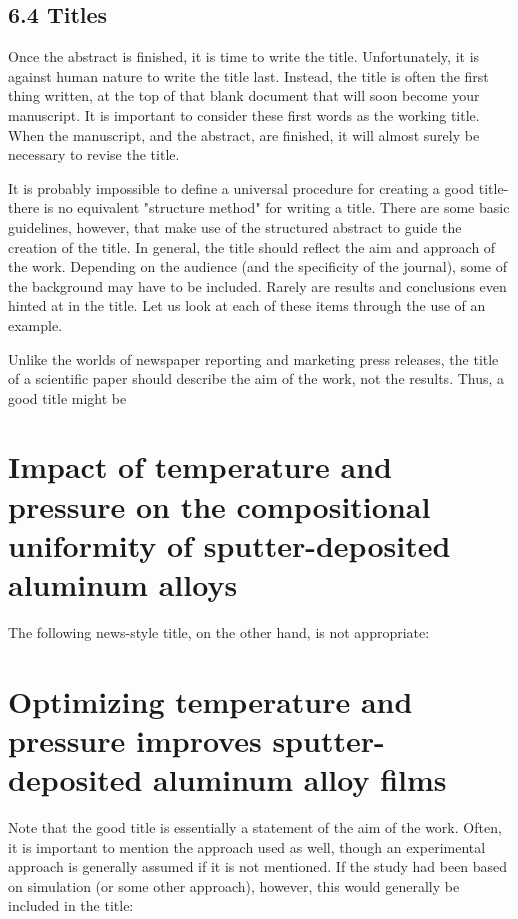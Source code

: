 \subsection*{6.4 Titles}
Once the abstract is finished, it is time to write the title. Unfortunately, it is against human nature to write the title last. Instead, the title is often the first thing written, at the top of that blank document that will soon become your manuscript. It is important to consider these first words as the working title. When the manuscript, and the abstract, are finished, it will almost surely be necessary to revise the title.

It is probably impossible to define a universal procedure for creating a good title- there is no equivalent "structure method" for writing a title. There are some basic guidelines, however, that make use of the structured abstract to guide the creation of the title. In general, the title should reflect the aim and approach of the work. Depending on the audience (and the specificity of the journal), some of the background may have to be included. Rarely are results and conclusions even hinted at in the title. Let us look at each of these items through the use of an example.

Unlike the worlds of newspaper reporting and marketing press releases, the title of a scientific paper should describe the aim of the work, not the results. Thus, a good title might be

\section*{Impact of temperature and pressure on the compositional uniformity of sputter-deposited aluminum alloys}
The following news-style title, on the other hand, is not appropriate:

\section*{Optimizing temperature and pressure improves sputter-deposited aluminum alloy films}
Note that the good title is essentially a statement of the aim of the work. Often, it is important to mention the approach used as well, though an experimental approach is generally assumed if it is not mentioned. If the study had been based on simulation (or some other approach), however, this would generally be included in the title:

